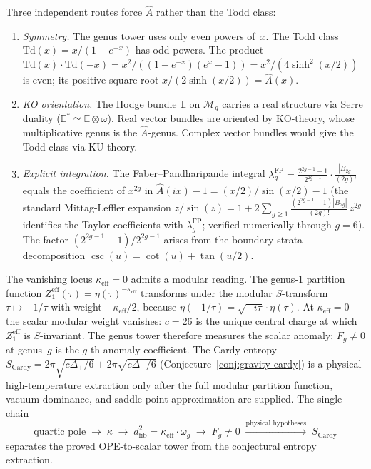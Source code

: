 \begin{remark}
\label{rem:why-A-hat-genus}
%
Three independent routes force $\hat{A}$ rather than the Todd class:
\begin{enumerate}
\item \emph{Symmetry.} The genus tower uses only even powers of~$x$.
 The Todd class $\mathrm{Td}(x) = x/(1-e^{-x})$ has odd powers.
 The product $\mathrm{Td}(x)\cdot\mathrm{Td}(-x)
 = x^2/((1-e^{-x})(e^x-1)) = x^2/(4\sinh^2(x/2))$ is even;
 its positive square root $x/(2\sinh(x/2)) = \hat{A}(x)$.
\item \emph{KO orientation.} The Hodge bundle $\mathbb{E}$ on
 $\overline{\mathcal{M}}_g$ carries a real structure via Serre
 duality ($\mathbb{E}^* \simeq \mathbb{E} \otimes \omega$).
 Real vector bundles are oriented by KO-theory, whose
 multiplicative genus is the $\hat{A}$-genus. Complex vector
 bundles would give the Todd class via KU-theory.
\item \emph{Explicit integration.} The Faber--Pandharipande
 integral
 $\lambda_g^{\mathrm{FP}}
 = \frac{2^{2g-1}-1}{2^{2g-1}} \cdot \frac{|B_{2g}|}{(2g)!}$
 equals the coefficient of $x^{2g}$ in
 $\hat{A}(ix) - 1 = (x/2)/\sin(x/2) - 1$
 (the standard Mittag-Leffler expansion
 $z/\sin(z) = 1 + 2\sum_{g \ge 1}
 \tfrac{(2^{2g-1}-1)|B_{2g}|}{(2g)!}\,z^{2g}$
 identifies the Taylor coefficients with
 $\lambda_g^{\mathrm{FP}}$; verified numerically through
 $g = 6$). The factor
 $(2^{2g-1}-1)/2^{2g-1}$ arises from the boundary-strata
 decomposition $\csc(u) = \cot(u) + \tan(u/2)$.
\end{enumerate}
\end{remark}

\medskip

The vanishing locus $\kappa_{\mathrm{eff}} = 0$ admits
a modular reading.
The genus-$1$ partition function
$Z_1^{\mathrm{eff}}(\tau) = \eta(\tau)^{-\kappa_{\mathrm{eff}}}$
transforms under the modular $S$-transform
$\tau \mapsto -1/\tau$ with weight $-\kappa_{\mathrm{eff}}/2$,
because $\eta(-1/\tau) = \sqrt{-i\tau}\cdot\eta(\tau)$.
At $\kappa_{\mathrm{eff}} = 0$ the scalar modular weight vanishes:
$c = 26$ is the unique central charge at which
$Z_1^{\mathrm{eff}}$ is $S$-invariant.
The genus tower therefore measures the scalar anomaly:
$F_g \ne 0$ at genus~$g$ is the $g$-th
anomaly coefficient. The Cardy entropy
$S_{\mathrm{Cardy}} =
2\pi\sqrt{c\Delta_+/6} + 2\pi\sqrt{c\Delta_-/6}$
\textup{(}Conjecture~\textup{\ref{conj:gravity-cardy})}
is a physical high-temperature extraction only after the full modular
partition function, vacuum dominance, and saddle-point approximation
are supplied.
The single chain
\[
\text{quartic pole}
\;\longrightarrow\;
\kappa
\;\longrightarrow\;
d_{\mathrm{fib}}^2 = \kappa_{\mathrm{eff}}\cdot\omega_g
\;\longrightarrow\;
F_g \ne 0
\;\xrightarrow{\text{physical hypotheses}}\;
S_{\mathrm{Cardy}}
\]
separates the proved OPE-to-scalar tower from the conjectural entropy
extraction.

